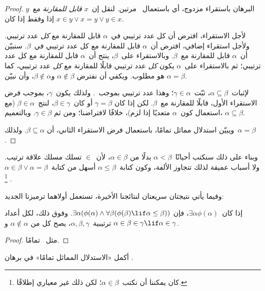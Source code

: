 \documentclass[../../../include/open-logic-section]{subfiles}
\begin{document}
\begin{proof}
البرهان باستقراء مزدوج، أي باستعمال~ مرتين.
لنقل إن~$x$ \emph{قابل للمقارنة} مع~$y$ إذا وفقط إذا كان
$x \in y \lor x = y \lor y \in x$.

لأجل الاستقراء، افترض أن كل عدد ترتيبي في~$\alpha$ قابل للمقارنة مع
\emph{كل} عدد ترتيبي. ولأجل استقراء إضافي، افترض أن~$\alpha$ قابل
للمقارنة مع كل عدد ترتيبي في~$\beta$. سنبيّن أن~$\alpha$ قابل للمقارنة
مع~$\beta$. وبالاستقراء على~$\beta$، ينتج أن~$\alpha$ قابل للمقارنة مع
كل عدد ترتيبي؛ ثم بالاستقراء على~$\alpha$ يكون \emph{كل} عدد ترتيبي
قابلًا للمقارنة مع \emph{كل} عدد ترتيبي، كما هو مطلوب. ويكفي أن نفترض
$\alpha \notin \beta$ و$\beta \notin \alpha$، وأن نبيّن
$\alpha = \beta$.

لإثبات~$\alpha \subseteq \beta$، ثبّت~$\gamma \in \alpha$؛ وهذا عدد
ترتيبي بموجب~. ولذلك يكون~$\gamma$، بموجب فرض
الاستقراء الأول، قابلًا للمقارنة مع~$\beta$. لكن إذا كان
$\gamma = \beta$ أو كان~$\beta \in \gamma$، لنتج~$\beta \in \alpha$
(مع استعمال كون~$\alpha$ متعديًا إذا لزم)، خلافًا لافتراضنا؛ ومن ثم
$\gamma \in \beta$. وبالتعميم، $\alpha \subseteq \beta$.

ويبيّن استدلال مماثل تمامًا، باستعمال فرض الاستقراء الثاني، أن
$\beta \subseteq \alpha$. ولذلك~$\alpha = \beta$.
\end{proof}\noindent
وبناء على ذلك سنكتب أحيانًا~$\alpha <\beta$ بدلًا من
$\alpha \in \beta$، لأن~$\in$ تسلك مسلك علاقة ترتيب. ولا أسباب
عميقة لذلك تتجاوز الألفة، وكون كتابة~$\alpha \leq \beta$ أسهل من
كتابة~$\alpha \in \beta \lor \alpha = \beta$.
\footnote{كان يمكننا أن نكتب~$\alpha \mathrel{\underline{\in}} \beta$؛
لكن ذلك غير معياري إطلاقًا.}

وفيما يأتي نتيجتان سريعتان لنتائجنا الأخيرة، تستعمل أولاهما ترميزنا
الجديد:

\begin{cor}
إذا كان~$\exists \alpha\phi(\alpha)$، فإن
$\exists \alpha(\phi(\alpha) \land
\forall \beta(\phi(\beta) \lif \alpha \leq \beta))$. وفوق ذلك، لكل
أعداد ترتيبية~$\alpha, \beta, \gamma$، يصح كل من
$\alpha \notin \alpha$ و
$\alpha \in \beta \in \gamma \lif \alpha \in \gamma$.
\end{cor}

\begin{proof}
مثل~ تمامًا.
\end{proof}

\begin{prob}
أكمل «الاستدلال المماثل تمامًا» في برهان
.
\end{prob}
\end{document}

